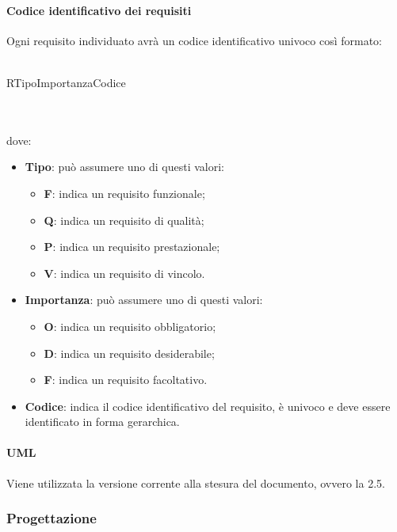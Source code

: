  \paragraph{Codice identificativo dei requisiti}
 Ogni requisito individuato avrà un codice identificativo univoco così formato: \\ \\
 \centerline{R\textbraceleft{}Tipo\textbraceright{}\textbraceleft{}Importanza\textbraceright{}\textbraceleft{}Codice\textbraceright{}}
 \\ \\
 dove:
 \begin{itemize}
 	\item \textbf{Tipo}: può assumere uno di questi valori:
 	\begin{itemize}
 		\item \textbf{F}: indica un requisito funzionale;
 		\item \textbf{Q}: indica un requisito di qualità;
 		\item \textbf{P}: indica un requisito prestazionale;
 		\item \textbf{V}: indica un requisito di vincolo.
 	\end{itemize}
 	\item \textbf{Importanza}: può assumere uno di questi valori:
 	\begin{itemize}
 		\item \textbf{O}: indica un requisito obbligatorio;
 		\item \textbf{D}: indica un requisito desiderabile;
 		\item \textbf{F}: indica un requisito facoltativo.
 	\end{itemize}
 	\item \textbf{Codice}: indica il codice identificativo del requisito, è univoco e deve essere identificato in forma gerarchica.
 \end{itemize}
 \paragraph{UML}
 Viene utilizzata la versione corrente alla stesura del documento, ovvero la 2.5.
 \subsubsection{Progettazione}\label{progettazione}
